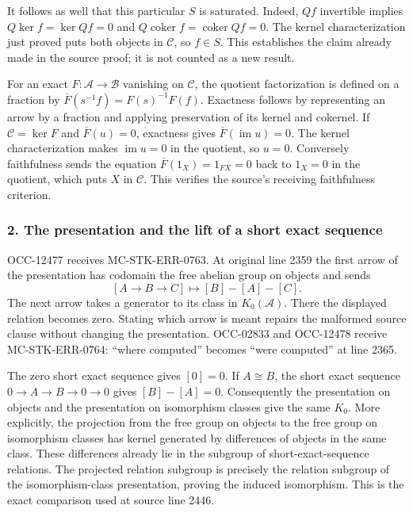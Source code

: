 \documentclass[11pt]{article}
\begin{document}
It follows as well that this particular \(S\) is saturated. Indeed, \(Qf\) invertible implies \(Q\ker f=\ker Qf=0\) and \(Q\operatorname{coker}f=\operatorname{coker}Qf=0\). The kernel characterization just proved puts both objects in \(\mathcal C\), so \(f\in S\). This establishes the claim already made in the source proof; it is not counted as a new result.

For an exact \(F:\mathcal A\to\mathcal B\) vanishing on \(\mathcal C\), the quotient factorization is defined on a fraction by \(\overline F(s^{-1}f)=F(s)^{-1}F(f)\). Exactness follows by representing an arrow by a fraction and applying preservation of its kernel and cokernel. If \(\mathcal C=\ker F\) and \(\overline F(u)=0\), exactness gives \(\overline F(\operatorname{im}u)=0\). The kernel characterization makes \(\operatorname{im}u=0\) in the quotient, so \(u=0\). Conversely faithfulness sends the equation \(\overline F(1_X)=1_{FX}=0\) back to \(1_X=0\) in the quotient, which puts \(X\) in \(\mathcal C\). This verifies the source's receiving faithfulness criterion.

\subsubsection{2. The presentation and the lift of a short exact sequence}\label{the-presentation-and-the-lift-of-a-short-exact-sequence}

OCC-12477 receives MC-STK-ERR-0763. At original line 2359 the first arrow of the presentation has codomain the free abelian group on objects and sends \[
[A\to B\to C]\longmapsto[B]-[A]-[C].
\] The next arrow takes a generator to its class in \(K_0(\mathcal A)\). There the displayed relation becomes zero. Stating which arrow is meant repairs the malformed source clause without changing the presentation. OCC-02833 and OCC-12478 receive MC-STK-ERR-0764: ``where computed'' becomes ``were computed'' at line 2365.

The zero short exact sequence gives \([0]=0\). If \(A\cong B\), the short exact sequence \(0\to A\to B\to0\to0\) gives \([B]-[A]=0\). Consequently the presentation on objects and the presentation on isomorphism classes give the same \(K_0\). More explicitly, the projection from the free group on objects to the free group on isomorphism classes has kernel generated by differences of objects in the same class. These differences already lie in the subgroup of short-exact-sequence relations. The projected relation subgroup is precisely the relation subgroup of the isomorphism-class presentation, proving the induced isomorphism. This is the exact comparison used at source line 2446.
\end{document}
